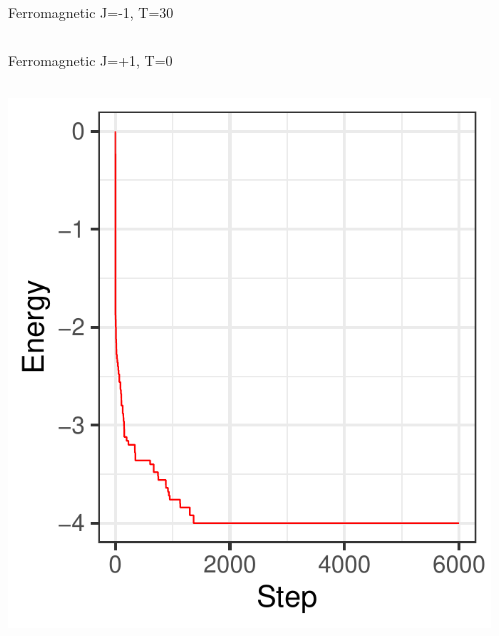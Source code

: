 \documentclass{beamer}
\begin{document}
\begin{frame}{Ferromagnetic J=-1, T=30}
\begin{columns}
\begin{column}{0.5\textwidth}
\begin{center}
     \end{center}
\end{column}
\end{columns}
\end{frame}

\begin{frame}{Ferromagnetic J=+1, T=0}
\begin{columns}
\begin{column}{0.5\textwidth}
    \begin{center}
     \includegraphics[width=\textwidth]{Pic/J+1_10_6000_T=0_ENERGY.pdf}
     \end{center}
\end{column}
\begin{column}{0.5\textwidth}
    \begin{center}

\end{center}
\end{column}
\end{columns}
\end{frame}
\end{document}
